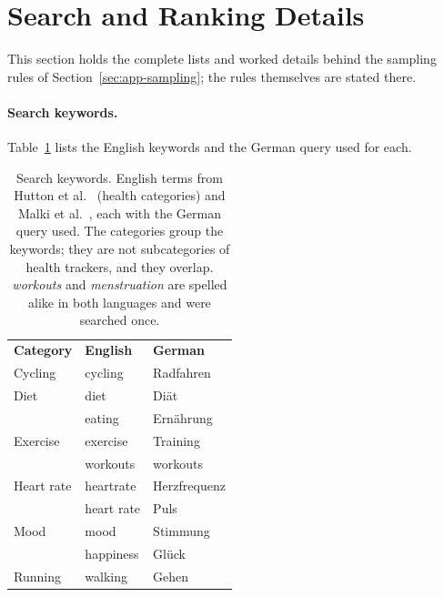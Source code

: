 \section{Search and Ranking Details}
\label{app:sampling-details}
This section holds the complete lists and worked details behind the sampling rules of
Section~\ref{sec:app-sampling}; the rules themselves are stated there.

\paragraph{Search keywords.} Table~\ref{tab:keywords} lists the English keywords and the German
query used for each.

\begin{table}[H]
\centering
\begin{singlespace}
\caption[Search keywords]{Search keywords. English terms from Hutton et
al.~\parencite[Table~2]{hutton2018assessing} (health categories) and Malki et
al.~\parencite[\S3.1]{malki2024exploring}, each with the German query used.
The categories group the keywords; they are not subcategories of health trackers, and they
overlap. \emph{workouts} and \emph{menstruation} are spelled alike in both languages and
were searched once.}
\label{tab:keywords}
\small
\setlength{\aboverulesep}{0.25ex}\setlength{\belowrulesep}{0.35ex}
\begin{tabularx}{\textwidth}{@{}>{\raggedright\arraybackslash}p{3.2cm}>{\raggedright\arraybackslash}X>{\raggedright\arraybackslash}X@{}}
\toprule
 & \multicolumn{2}{c}{\textbf{Keywords}} \\
\cmidrule(lr){2-3}
\textbf{Category} & \textbf{English} & \textbf{German} \\
\midrule
Cycling & cycling & Radfahren \\
\addlinespace
Diet & diet & Diät \\
 & eating & Ernährung \\
\addlinespace
Exercise & exercise & Training \\
 & workouts & workouts \\
\addlinespace
Heart rate & heartrate & Herzfrequenz \\
 & heart rate & Puls \\
\addlinespace
Mood & mood & Stimmung \\
 & happiness & Glück \\
\addlinespace
Running & walking & Gehen \\

\end{tabularx}
\end{singlespace}
\end{table}
